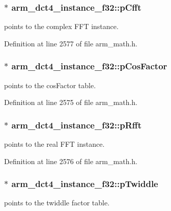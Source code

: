 \hypertarget{structarm__dct4__instance__f32_a018f7860b6e070af533fb7d76c7cdc32}{
\subsubsection[{p\-Cfft}]{$\ast$ arm\-\_\-dct4\-\_\-instance\-\_\-f32\-::p\-Cfft}}\label{structarm__dct4__instance__f32_a018f7860b6e070af533fb7d76c7cdc32}
points to the complex F\-F\-T instance. 

Definition at line 2577 of file arm\-\_\-math.\-h.

\hypertarget{structarm__dct4__instance__f32_a6da1187e070801e011ce5e0582efa861}{
\subsubsection[{p\-Cos\-Factor}]{$\ast$ arm\-\_\-dct4\-\_\-instance\-\_\-f32\-::p\-Cos\-Factor}}\label{structarm__dct4__instance__f32_a6da1187e070801e011ce5e0582efa861}
points to the cos\-Factor table. 

Definition at line 2575 of file arm\-\_\-math.\-h.

\hypertarget{structarm__dct4__instance__f32_a978f37fc19add31af243ab5c63ae502f}{
\subsubsection[{p\-Rfft}]{$\ast$ arm\-\_\-dct4\-\_\-instance\-\_\-f32\-::p\-Rfft}}\label{structarm__dct4__instance__f32_a978f37fc19add31af243ab5c63ae502f}
points to the real F\-F\-T instance. 

Definition at line 2576 of file arm\-\_\-math.\-h.

\hypertarget{structarm__dct4__instance__f32_ad13544aafad268588c62e3eb35ae662c}{
\subsubsection[{p\-Twiddle}]{$\ast$ arm\-\_\-dct4\-\_\-instance\-\_\-f32\-::p\-Twiddle}}\label{structarm__dct4__instance__f32_ad13544aafad268588c62e3eb35ae662c}
points to the twiddle factor table. 


